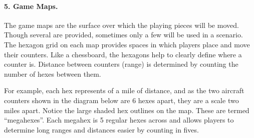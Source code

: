 \paragraph{5. Game Maps.} The game maps are the surface over which the playing pieces will be moved. Though several are provided, sometimes only a few will be used in a scenario. The hexagon grid on each map provides spaces in which players place and move their counters. Like a chessboard, the hexagons help to clearly define where a counter is. Distance between counters (range) is determined by counting the number of hexes between them. 

For example,  each hex represents {\onethird} of a mile of distance, and as the two aircraft counters shown in the diagram below are 6 hexes apart, they are a scale two miles apart. 
Notice the large shaded hex outlines on the map. These are termed “megahexes”. Each megahex is 5 regular hexes across and allows players to determine long ranges and distances easier by counting in fives. 


